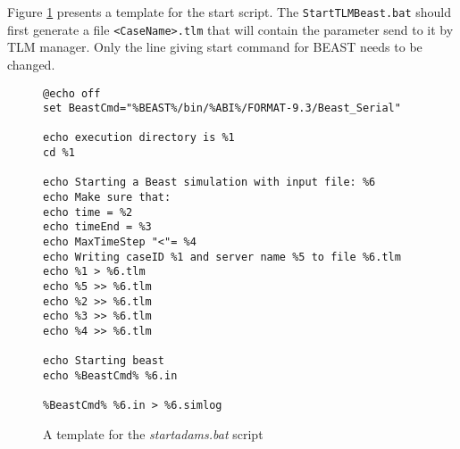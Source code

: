 Figure \ref{figStartBeast} presents a template for the start script.
The \verb!StartTLMBeast.bat! should first generate a file \verb!<CaseName>.tlm!
that will contain the parameter send to it by TLM manager.
Only the line giving start command for BEAST needs to be changed.

\begin{figure}[h]
\small{
\begin{verbatim}
@echo off
set BeastCmd="%BEAST%/bin/%ABI%/FORMAT-9.3/Beast_Serial"

echo execution directory is %1
cd %1

echo Starting a Beast simulation with input file: %6
echo Make sure that:
echo time = %2
echo timeEnd = %3
echo MaxTimeStep "<"= %4
echo Writing caseID %1 and server name %5 to file %6.tlm
echo %1 > %6.tlm
echo %5 >> %6.tlm
echo %2 >> %6.tlm
echo %3 >> %6.tlm
echo %4 >> %6.tlm

echo Starting beast
echo %BeastCmd% %6.in

%BeastCmd% %6.in > %6.simlog
\end{verbatim}
}
\caption{A template for the \emph{startadams.bat} script\label{figStartBeast}}
\end{figure}

